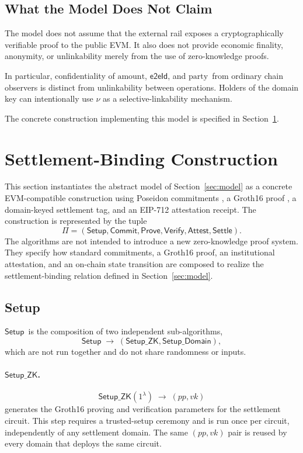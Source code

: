 \documentclass[10pt,twocolumn]{article}
\newcommand{\eeid}{\ensuremath{\mathsf{e2eId}}}
\newcommand{\amount}{\ensuremath{\text{amount}}}
\newcommand{\party}{\ensuremath{\text{party}}}
\newcommand{\Setup}{\ensuremath{\mathsf{Setup}}}
\newcommand{\SetupZK}{\ensuremath{\mathsf{Setup\_ZK}}}
\newcommand{\SetupDomain}{\ensuremath{\mathsf{Setup\_Domain}}}
\newcommand{\Commit}{\ensuremath{\mathsf{Commit}}}
\newcommand{\Prove}{\ensuremath{\mathsf{Prove}}}
\newcommand{\Verify}{\ensuremath{\mathsf{Verify}}}
\newcommand{\Attest}{\ensuremath{\mathsf{Attest}}}
\newcommand{\Settle}{\ensuremath{\mathsf{Settle}}}
\begin{document}
\subsection{What the Model Does Not Claim}

The model does not assume that the external rail exposes a
cryptographically verifiable proof to the public EVM. It also does not
provide economic finality, anonymity, or unlinkability merely from the
use of zero-knowledge proofs.

In particular, confidentiality of \amount, \eeid, and \party\ from
ordinary chain observers is distinct from unlinkability between
operations. Holders of the domain key can intentionally use $\nu$ as a
selective-linkability mechanism.

The concrete construction implementing this model is specified in
Section~\ref{sec:construction}.

\section{Settlement-Binding Construction}
\label{sec:construction}

This section instantiates the abstract model of Section~\ref{sec:model}
as a concrete EVM-compatible construction using Poseidon commitments
\cite{poseidon}, a Groth16 proof \cite{groth16}, a domain-keyed settlement
tag, and an EIP-712 attestation receipt. The construction is represented
by the tuple
\[
\Pi = (\Setup, \Commit, \Prove, \Verify, \Attest, \Settle).
\]
The algorithms are not intended to introduce a new zero-knowledge proof
system. They specify how standard commitments, a Groth16 proof, an
institutional attestation, and an on-chain state transition are composed
to realize the settlement-binding relation defined in
Section~\ref{sec:model}.

\subsection{Setup}

\Setup\ is the composition of two independent sub-algorithms,
\[
\Setup \;\rightarrow\; (\SetupZK, \SetupDomain),
\]
which are not run together and do not share randomness or inputs.

\paragraph{\SetupZK.}
\[
\SetupZK(1^\lambda) \;\rightarrow\; (pp,vk)
\]
generates the Groth16 proving and verification parameters for the
settlement circuit. This step requires a trusted-setup ceremony and is
run once per circuit, independently of any settlement domain. The same
$(pp,vk)$ pair is reused by every domain that deploys the same circuit.
\end{document}
